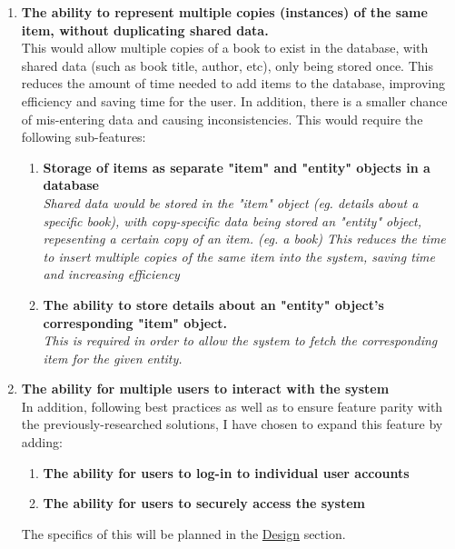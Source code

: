 \documentclass[../../../main.tex]{subfiles}
\begin{document}
\begin{enumerate}
      \item \textbf{The ability to represent multiple copies (instances) of the same item, without duplicating shared data.}\\
            This would allow multiple copies of a book to exist in the database, with shared data (such as book title, author, etc), only being stored once.
            This reduces the amount of time needed to add items to the database, improving efficiency and saving time for the user.
            In addition, there is a smaller chance of mis-entering data and causing inconsistencies.
            This would require the following sub-features:
            \begin{enumerate}
                  \item \textbf{Storage of items as separate "item" and "entity" objects in a database}\\
                        \textit{Shared data would be stored in the "item" object (eg. details about
                              a specific book), with copy-specific data being stored an "entity" object,
                              repesenting a certain copy of an item. (eg. a book)
                              This reduces the time to insert multiple copies of the same item into the
                              system, saving time and increasing efficiency}
                  \item \textbf{The ability to store details about an "entity" object's corresponding "item" object.}\\
                        \textit{This is required in order to allow the system to fetch the
                              corresponding item for the given entity.}
            \end{enumerate}

      \item \textbf{The ability for multiple users to interact with the system}\\
            In addition, following best practices as well as to ensure feature parity with the
            previously-researched solutions, I have chosen to expand this feature by adding:
            \begin{enumerate}
                  \item \textbf{The ability for users to log-in to individual user accounts}
                  \item \textbf{The ability for users to securely access the system}
            \end{enumerate}
            The specifics of this will be planned in the \underline{Design} section.


\end{enumerate}
\end{document}
